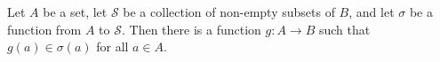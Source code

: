 Let $A$ be a set, let $\mathcal{S}$ be a collection of non-empty subsets of $B$, and let $\sigma$ be a function from $A$ to $\mathcal{S}$. Then there is a function $g: A \to B$ such that $g(a) \in \sigma(a)$ for all $a \in A$.
